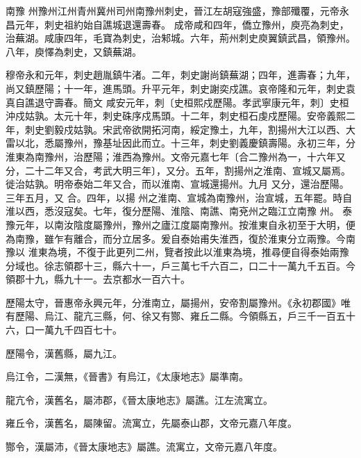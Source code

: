 
\begin{pinyinscope}

 南豫
 州豫州江州青州冀州司州南豫州刺史，晉江左胡寇強盛，豫部殲覆，元帝永昌元年，刺史祖約始自譙城退還壽春。
 成帝咸和四年，僑立豫州，庾亮為刺史，治蕪湖。咸康四年，毛寶為刺史，治邾城。六年，荊州刺史庾翼鎮武昌，領豫州。八年，庾懌為刺史，又鎮蕪湖。



 穆帝永和元年，刺史趙胤鎮牛渚。二年，刺史謝尚鎮蕪湖；四年，進壽春；九年，尚又鎮歷陽；十一年，進馬頭。升平元年，刺史謝奕戍譙。哀帝隆和元年，刺史袁真自譙退守壽春。簡文
 咸安元年，刺〔史桓熙戍歷陽。孝武寧康元年，刺〕史桓沖戍姑孰。太元十年，刺史硃序戍馬頭。十二年，刺史桓石虔戍歷陽。安帝義熙二年，刺史劉毅戍姑孰。宋武帝欲開拓河南，綏定豫土，九年，割揚州大江以西、大雷以北，悉屬豫州，豫基址因此而立。十三年，刺史劉義慶鎮壽陽。永初三年，分淮東為南豫州，治歷陽；淮西為豫州。文帝元嘉七年〔合二豫州為一，十六年又分，二十二年又合，考武大明三年〕，又分。五年，割揚州之淮南、宣城又屬焉。徙治姑孰。明帝泰始二年又合，而以淮南、宣城還揚州。九月
 又分，還治歷陽。三年五月，又
 合。四年，以揚
 州之淮南、宣城為南豫州，治宣城，五年罷。時自淮以西，悉沒寇矣。七年，復分歷陽、淮陰、南譙、南兗州之臨江立南豫
 州。
 泰豫元年，以南汝陰度屬豫州，豫州之廬江度屬南豫州。按淮東自永初至于大明，便為南豫，雖乍有離合，而分立居多。爰自泰始甫失淮西，復於淮東分立兩豫。今南豫以
 淮東為境，不復于此更列二州，覽者按此以淮東為境，推尋便自得泰始兩豫分域也。徐志領郡十三，縣六十一，戶三萬七千六百二，口二十一萬九千五百。今領郡十九，縣九十一。去京都水一百六十。



 歷陽太守，晉惠帝永興元年，分淮南立，屬揚州，安帝割屬豫州。《永初郡國》唯有歷陽、烏江、龍亢三縣，何、徐又有酂、雍丘二縣。今領縣五，戶三千一百五十六，口一萬九千四百七十。



 歷陽令，漢舊縣，屬九江。



 烏江令，二漢無，《晉書》有烏江，《太康地志》屬準南。



 龍亢令，漢舊名，屬沛郡，《晉太康地志》屬譙。江左流寓立。



 雍丘令，漢舊名，屬陳留。流寓立，先屬泰山郡，文帝元嘉八年度。



 酂令，漢屬沛，《晉太康地志》屬譙。流寓立，文帝元嘉八年度。



\end{pinyinscope}
